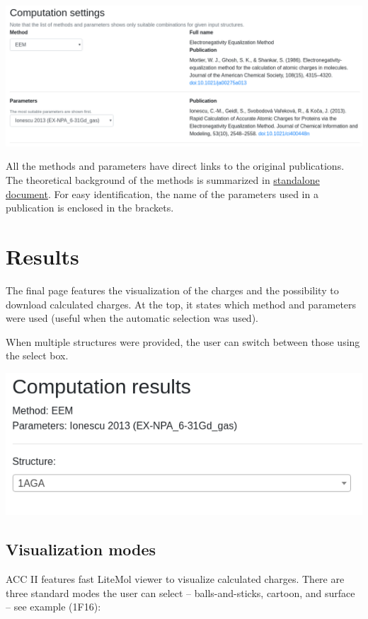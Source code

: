 \documentclass[oneside]{memoir}
\begin{document}
\begin{center}
    \includegraphics[width=.9\linewidth]{images/settings.png}
\end{center}

All the methods and parameters have direct links to the original publications. The theoretical background of the methods is summarized in \href{https://acc2.ncbr.muni.cz/static/methods.pdf}{standalone document}. For easy identification, the name of the parameters used in a publication is enclosed in the brackets.

\section*{Results}
The final page features the visualization of the charges and the possibility to download calculated charges. At the top, it states which method and parameters were used (useful when the automatic selection was used).

When multiple structures were provided, the user can switch between those using the select box.

\begin{center}
    \includegraphics[width=.5\linewidth]{images/select.png}
\end{center}

\subsection*{Visualization modes}
ACC II features fast LiteMol viewer to visualize calculated charges. There are three standard modes the user can select – balls-and-sticks, cartoon, and surface –  see example (1F16):
\end{document}

